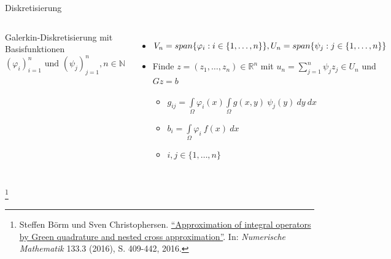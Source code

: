 \documentclass[10pt]{beamer}
\let\svthefootnote\thefootnote
\begin{document}
\begin{frame}{Diskretisierung}
  \begin{columns}
      Galerkin-Diskretisierung mit Basisfunktionen\\
      \({(\varphi_{i})}_{i = 1}^{n} \text{ und }
        {(\psi_{j})}_{j = 1}^{n}, n \in \mathbb{N}\)
      \begin{itemize}
        \item \( V_{n} = span\{ \varphi_{i} : i \in \{ 1, \hdots, n\} \},
                \newline
                U_{n} = span\{ \psi_{j} : j \in \{ 1, \hdots, n\} \} \)
        \item Finde \(z = (z_{1}, \hdots, z_{n}) \in \mathbb{R}^{n} \) mit
              \( u_{n}  = \sum\limits_{j = 1}^{n} \psi_{j} z_{j} \in U_{n} \) 
              und \( Gz = b \)
        \begin{itemize}
          \item \( g_{ij} = \int\limits_{\Omega} \varphi_{i}(x)
                   \int\limits_{\Omega} g(x, y) \ \psi_{j}(y) \ dy \ dx \)
          \item \(b_{i} = \int\limits_{\Omega} \varphi_{i} \ f(x) \ dx\)
          \item \( i, j \in \{ 1, \hdots, n \} \)
        \end{itemize}
      \end{itemize}
      \centering
      \includegraphics[width=1.5\linewidth]{figures/fg-sphere-tri.pdf}
  \end{columns}
  \footnotesize
  \let\thefootnote\relax\footnote{Steffen Börm und Sven Christophersen.
  \href{https://link.springer.com/article/10.1007\%2Fs00211-015-0757-y}{
  ``Approximation of integral operators by Green quadrature and nested cross 
  approximation''}. In:   \textit{Numerische Mathematik} 133.3 (2016), S. 
  409-442, 2016.}
  \addtocounter{footnote}{-1}\let\thefootnote\svthefootnote\relax
  \normalsize
\end{frame}
\end{document}
